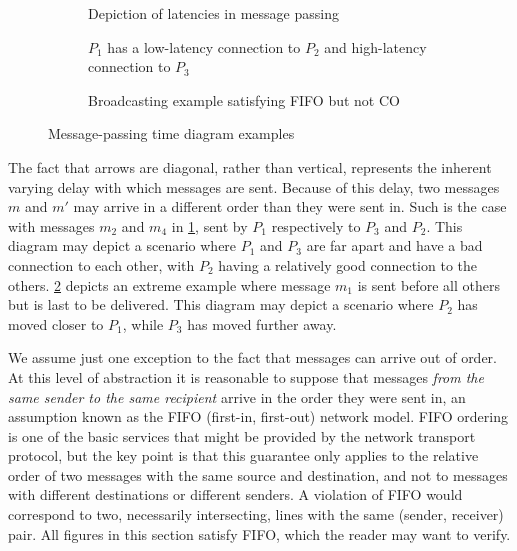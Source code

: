 \documentclass[]             %
{NASA}                       %
\theoremstyle{definition}
\begin{document}
\begin{figure}[p]
  \setlength\belowcaptionskip{5ex}

  \begin{subfigure}{1\textwidth}
    \centering
    
    \caption{Depiction of latencies in message passing}
    \label{fig:message-latencies-a}
  \end{subfigure}

  \begin{subfigure}{1\textwidth}
    \centering 
    \caption{$P_1$ has a low-latency connection to $P_2$ and high-latency connection to $P_3$}
    \label{fig:message-latencies-b}
  \end{subfigure}


  \begin{subfigure}{1\textwidth}
    \centering 
    \caption{Broadcasting example satisfying FIFO but not CO}
    \label{fig:message-latencies-c}
  \end{subfigure}

  \caption{Message-passing time diagram examples}
  \label{fig:message-latencies}
\end{figure}

\afterpage{\clearpage}

The fact that arrows are diagonal, rather than vertical, represents
the inherent varying delay with which messages are sent. Because of
this delay, two messages $m$ and $m'$ may arrive in a different order
than they were sent in.
Such is the case with messages $m_2$ and $m_4$ in
\ref{fig:message-latencies-a}, sent by $P_1$ respectively to $P_3$ and
$P_2$. This diagram may depict a scenario where $P_1$ and $P_3$ are
far apart and have a bad connection to each other, with $P_2$ having a
relatively good connection to the
others. \ref{fig:message-latencies-b} depicts an extreme example where
message $m_1$ is sent before all others but is last to be
delivered. This diagram may depict a scenario where $P_2$ has moved
closer to $P_1$, while $P_3$ has moved further away.

We assume just one exception to the fact that messages can arrive out
of order. At this level of abstraction it is reasonable to suppose
that messages \emph{from the same sender to the same recipient} arrive
in the order they were sent in, an assumption known as the FIFO
(first-in, first-out) network model. FIFO ordering is one of the basic
services that might be provided by the network transport protocol, but
the key point is that this guarantee only applies to the relative
order of two messages with the same source and destination, and not to
messages with different destinations or different senders. A violation
of FIFO would correspond to two, necessarily intersecting, lines with
the same (sender, receiver) pair. All figures in this section satisfy
FIFO, which the reader may want to verify.
\end{document}
